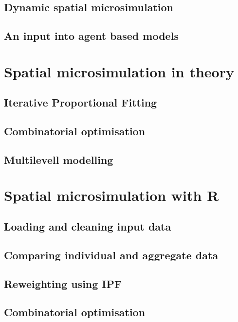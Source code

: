 \documentclass[a5paper, 11pt, twoside]{book}  %
\begin{document}
\section{Dynamic spatial microsimulation}

\section{An input into agent based models}

\chapter{Spatial microsimulation in theory}\label{s:theory}


\section{Iterative Proportional Fitting}

\section{Combinatorial optimisation}

\section{Multilevell modelling}

\chapter{Spatial microsimulation with R}


\section{Loading and cleaning input data}

\section{Comparing individual and aggregate data}

\section{Reweighting using IPF}

\section{Combinatorial optimisation}
\end{document}
